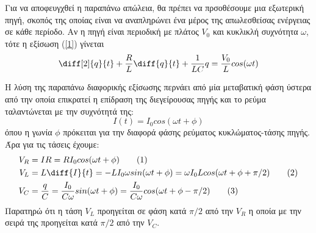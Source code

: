 \documentclass[a4paper]{article}
\newcommand\numberthis{\addtocounter{equation}{1}\tag{\theequation}}
\begin{document}
Για να αποφευγχθεί η παραπάνω απώλεια, θα πρέπει να πρσοθέσουμε μια εξωτερική πηγή, σκοπός της οποίας είναι να αναπληρώνει ένα μέρος της απωλεσθείσας ενέργειας σε κάθε περίοδο. Αν η πηγή είναι περιοδική με πλάτος $V_0$ και κυκλικλή συχνότητα $\omega$, τότε η εξίσωση (\ref{1}) γίνεται 
\begin{equation}\label{2}
\diff[2]{q}{t} +\frac{R}{L}\diff{q}{t} +\frac{1}{LC} q =  \frac{V_0}{L}cos(\omega t)
\end{equation}

Η λύση της παραπάνω διαφορικής εξίσωσης περνάει από μία μεταβατική φάση ύστερα από την οποία επικρατεί η επίδραση της διεγείρουσας πηγής και το ρεύμα ταλαντώνεται με την συχνότητά της:
\begin{equation}
I(t) = I_0 cos(\omega t+\phi)
\end{equation}
όπου η γωνία $\phi$ πρόκειται για την διαφορά φάσης ρεύματος κυκλώματος-τάσης πηγής. 
Άρα για τις τάσεις έχουμε:
\begin{align*}
V_R &= IR = RI_0 cos(\omega t + \phi) \numberthis \\ 
V_L &= L\diff{I}{t} = -LI_0\omega sin(\omega t + \phi) = \omega I_0 Lcos(\omega t+\phi + \pi/2) \numberthis\\ 
V_C &= \frac{q}{C} = \frac{I_0}{C\omega} sin(\omega t + \phi) =\frac{I_0}{C\omega}cos(\omega t + \phi -\pi/2)\numberthis
\end{align*} 
Παρατηρώ ότι η τάση $V_L$ προηγείται σε φάση κατά $\pi/2$ από την $V_R$ η οποία με την σειρά της προηγείται κατά $\pi/2$ από την $V_C$.
\end{document}
